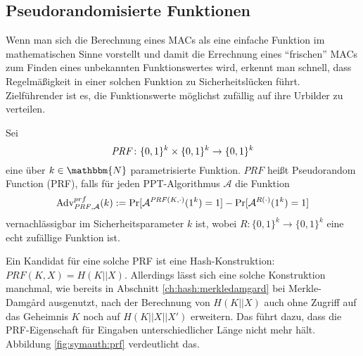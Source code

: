 \subsection{Pseudorandomisierte Funktionen}\label{ssec:prf} Wenn man
sich die Berechnung eines MACs als eine einfache Funktion im
mathematischen Sinne vorstellt und damit die Errechnung eines
"`frischen"' MACs zum Finden eines unbekannten Funktionswertes wird,
erkennt man schnell, dass Regelmäßigkeit in einer solchen Funktion zu
Sicherheitslücken führt. Zielführender ist es, die Funktionswerte
möglichst zufällig auf ihre Urbilder zu verteilen.
\begin{definition}
  Sei \[\text{\textit{PRF}}\colon\{0,1\}^k \times \{0, 1\}^k \rightarrow
    \{0,1\}^k\] eine über $k \in \mathbbm{N}$ parametrisierte
  Funktion. $PRF$ heißt Pseudorandom Function (PRF), falls für jeden
  PPT-Algorithmus $\mathcal{A}$ die Funktion
  \begin{equation*}
    \text{Adv}_{\text{\textit{PRF}},\mathcal{A}}^{prf}(k) := \Pr \lbrack
    \mathcal{A}^{\text{\textit{PRF}}(K,\cdot)}(1^k) = 1 \rbrack - \Pr
    \lbrack \mathcal{A}^{R(\cdot)}(1^k) = 1 \rbrack
  \end{equation*} vernachlässigbar im Sicherheitsparameter $k$ ist,
  wobei $R: \{0,1\}^k \rightarrow \{0,1\}^k$ eine echt zufällige Funktion
  ist.~\\
\end{definition}

Ein Kandidat für eine solche PRF ist eine Hash-Konstruktion: $PRF(K,X) =
H(K||X)$. Allerdings lässt sich eine solche Konstruktion manchmal, wie
bereits in Abschnitt \ref{ch:hash:merkledamgard} bei Merkle-Damgård
ausgenutzt, nach der Berechnung von $H(K||X)$ auch ohne Zugriff auf das
Geheimnis $K$ noch auf $H(K||X||X')$ erweitern. Das führt dazu, dass die
PRF-Eigenschaft für Eingaben unterschiedlicher Länge nicht mehr
hält. Abbildung \ref{fig:symauth:prf} verdeutlicht das.

